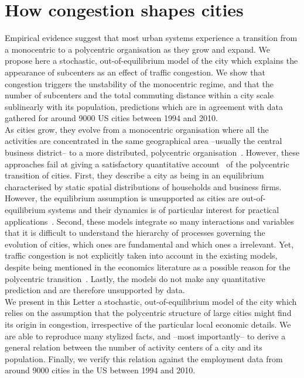\chapter{How congestion shapes cities}

Empirical evidence suggest that most urban systems experience a
transition from a monocentric to a polycentric organisation as they
grow and expand. We propose here a stochastic, out-of-equilibrium model of the
city which explains the appearance of subcenters as an effect of
traffic congestion. We show that congestion triggers the unstability
of the monocentric regime, and that the number of subcenters and the
total commuting distance within a city scale sublinearly with its
population, predictions which are in agreement with data gathered for
around 9000 US cities between 1994 and 2010.\\


As cities grow, they evolve from a monocentric organisation where all
the activities are concentrated in the same geographical area
--usually the central business district-- to a more distributed,
polycentric organisation~\cite{Kemper:1974,Odland:1978,Mills:1972,Griffith_PG:1981,Dokmeci:1994,McMillen:2003,Pereira:2013,Roth:2011}.  However, these approaches fail
at giving a satisfactory quantitative
account~\cite{Bouchaud:2008,Batty:2008} of the polycentric transition
of cities. First, they describe a city as being in an equilibrium
characterised by static spatial distributions of households and business
firms. However, the equilibrium assumption is unsupported as cities
are out-of-equilibrium systems and their
dynamics is of particular interest for practical
applications~\cite{Batty:2008}. Second, these models integrate so many
interactions and variables that it is difficult to understand the
hierarchy of processes governing the evolution of cities, which ones are fundamental and which ones a irrelevant. Yet, traffic congestion is not
explicitly taken into account in the existing models, despite being
mentioned in the economics literature as a possible reason for the
polycentric transition~\cite{McMillen:2003}. Lastly, the models do
not make any quantitative prediction and are therefore unsupported by
data.\\ 
We present in this Letter a stochastic, out-of-equilibrium model of the
city which relies on the assumption that the polycentric structure of
large cities might find its origin in congestion, irrespective of the
particular local economic details. We are able to reproduce many
stylized facts, and --most importantly-- to derive a general relation
between the number of activity centers of a city and its
population. Finally, we verify this relation against the employment
data from around 9000 cities in the US between 1994 and 2010.


